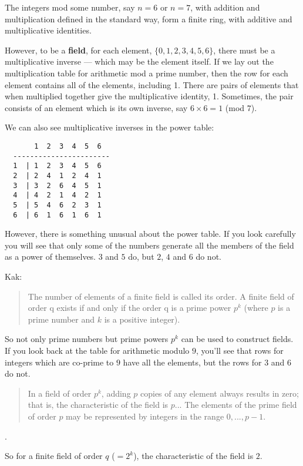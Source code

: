 \documentclass[11pt, oneside]{article}
\begin{document}
The integers mod some number, say $n = 6$ or $n = 7$, with addition and multiplication defined in the standard way, form a finite ring, with additive and multiplicative identities.

However, to be a \textbf{field}, for each element, ${\{0,1,2,3,4,5,6\}}$, there must be a multiplicative inverse --- which may be the element itself.  If we lay out the multiplication table for arithmetic mod a prime number, then the row for each element contains all of the elements, including 1.  There are pairs of elements that when multiplied together give the multiplicative identity, 1.  Sometimes, the pair consists of an element which is its own inverse, say $6 \times 6 = 1$ (mod $7$).

We can also see multiplicative inverses in the power table:

\begin{verbatim}
       1  2  3  4  5  6
  -----------------------
  1  | 1  2  3  4  5  6
  2  | 2  4  1  2  4  1
  3  | 3  2  6  4  5  1
  4  | 4  2  1  4  2  1
  5  | 5  4  6  2  3  1  
  6  | 6  1  6  1  6  1
\end{verbatim}

However, there is something unusual about the power table.  If you look carefully you will see that only some of the numbers generate all the members of the field as a power of themselves.  $3$ and $5$ do, but $2$, $4$ and $6$ do not.

Kak:

\begin{quote}The number of elements of a finite field is called its order. A finite field of order q exists if and only if the order q is a prime power $p^k$ (where $p$ is a prime number and $k$ is a positive integer).\end{quote}

So not only prime numbers but prime powers $p^k$ can be used to construct fields.  If you look back at the table for arithmetic modulo $9$, you'll see that rows for integers which are co-prime to $9$ have all the elements, but the rows for $3$ and $6$ do not.

\begin{quote}In a field of order $p^k$, adding $p$ copies of any element always results in zero; that is, the characteristic of the field is $p$... The elements of the prime field of order $p$ may be represented by integers in the range $0, ..., p-1$.\end{quote}.

So for a finite field of order $q$ ($= 2^k$), the characteristic of the field is $2$.
\end{document}
